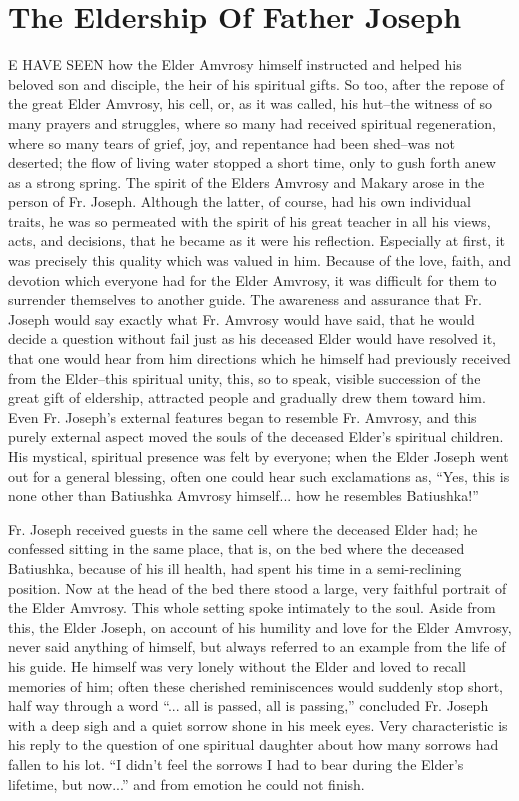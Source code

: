 \chapter{The Eldership Of Father Joseph}
E HAVE SEEN how the Elder Amvrosy himself instructed and helped his beloved son and disciple, the heir of his spiritual gifts. So too, after the repose of the great Elder Amvrosy, his cell, or, as it was called, his hut--the witness of so many prayers and struggles, where so many had received spiritual regeneration, where so many tears of grief, joy, and repentance had been shed--was not deserted; the flow of living water stopped a short time, only to gush forth anew as a strong spring. The spirit of the Elders Amvrosy and Makary arose in the person of Fr. Joseph. Although the latter, of course, had his own individual traits, he was so permeated with the spirit of his great teacher in all his views, acts, and decisions, that he became as it were his reflection. Especially at first, it was precisely this quality which was valued in him. Because of the love, faith, and devotion which everyone had for the Elder Amvrosy, it was difficult for them to surrender themselves to another guide. The awareness and assurance that Fr. Joseph would say exactly what Fr. Amvrosy would have said, that he would decide a question without fail just as his deceased Elder would have resolved it, that one would hear from him directions which he himself had previously received from the Elder--this spiritual unity, this, so to speak, visible succession of the great gift of eldership, attracted people and gradually drew them toward him. Even Fr. Joseph's external features began to resemble Fr. Amvrosy, and this purely external aspect moved the souls of the deceased Elder's spiritual children. His mystical, spiritual presence was felt by everyone; when the Elder Joseph went out for a general blessing, often one could hear such exclamations as, ``Yes, this is none other than Batiushka Amvrosy himself... how he resembles Batiushka!''

Fr. Joseph received guests in the same cell where the deceased Elder had; he confessed sitting in the same place, that is, on the bed where the deceased Batiushka, because of his ill health, had spent his time in a semi-reclining position. Now at the head of the bed there stood a large, very faithful portrait of the Elder Amvrosy. This whole setting spoke intimately to the soul. Aside from this, the Elder Joseph, on account of his humility and love for the Elder Amvrosy, never said anything of himself, but always referred to an example from the life of his guide. He himself was very lonely without the Elder and loved to recall memories of him; often these cherished reminiscences would suddenly stop short, half way through a word ``... all is passed, all is passing,'' concluded Fr. Joseph with a deep sigh and a quiet sorrow shone in his meek eyes. Very characteristic is his reply to the question of one spiritual daughter about how many sorrows had fallen to his lot. ``I didn't feel the sorrows I had to bear during the Elder's lifetime, but now...'' and from emotion he could not finish.

